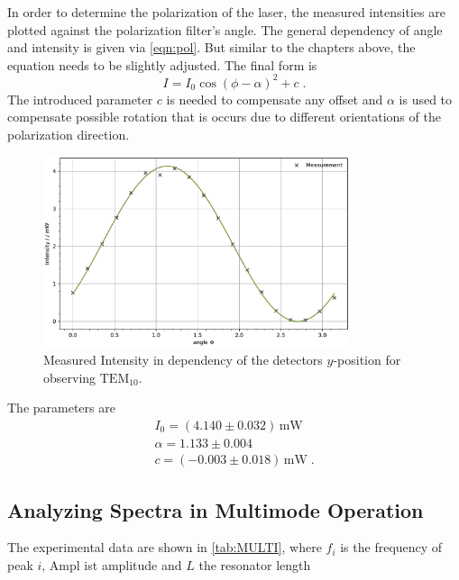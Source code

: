 In order to determine the polarization of the laser, the measured intensities are plotted against the polarization filter's angle.
The general dependency of angle and intensity is given via \autoref{eqn:pol}. But similar to the chapters above, the equation needs to be slightly adjusted.
The final form is
\begin{equation*}
    I=I_0\cos(\phi-\alpha)^2+c\; .
\end{equation*}
The introduced parameter $c$ is needed to compensate any offset and $\alpha$ is used to compensate possible rotation that is occurs due to different orientations of the polarization direction.
\begin{figure}
	\centering
	\includegraphics[width=0.8\textwidth]{content/plots/POLARI.pdf}
	\caption{Measured Intensity in dependency of the detectors $y$-position for observing $\text{TEM}_{10}$.}
	\label{fig:POLARI}
\end{figure}
The parameters are
\begin{align*}
    I_0 = (4.140\pm 0.032) \, \text{mW}\\
\alpha = 1.133\pm 0.004\\
c = (-0.003\pm 0.018)\, \text{mW}\; .
\end{align*}

\subsection{Analyzing Spectra in Multimode Operation}

The experimental data are shown in \autoref{tab:MULTI}, where $f_i$ is the frequency of peak $i$, $\text{Ampl}$ ist amplitude and $L$ the resonator length

